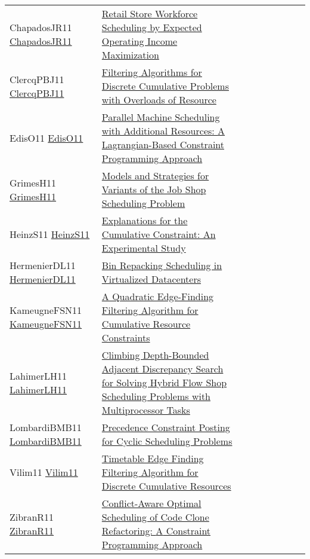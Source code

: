 {\begin{longtable}{p{3cm}p{7cm}lllllll}
ChapadosJR11 \href{https://doi.org/10.1007/978-3-642-21311-3\_7}{ChapadosJR11} &  \href{papers/ChapadosJR11.pdf}{Retail Store Workforce Scheduling by Expected Operating Income Maximization} &  &  &  &  &  &  & \\
ClercqPBJ11 \href{https://doi.org/10.1007/978-3-642-23786-7\_20}{ClercqPBJ11} &  \href{papers/ClercqPBJ11.pdf}{Filtering Algorithms for Discrete Cumulative Problems with Overloads of Resource} &  &  &  &  &  &  & \\
EdisO11 \href{https://doi.org/10.1007/978-3-642-21311-3\_10}{EdisO11} &  \href{papers/EdisO11.pdf}{Parallel Machine Scheduling with Additional Resources: {A} Lagrangian-Based Constraint Programming Approach} &  &  &  &  &  &  & \\
GrimesH11 \href{https://doi.org/10.1007/978-3-642-23786-7\_28}{GrimesH11} &  \href{papers/GrimesH11.pdf}{Models and Strategies for Variants of the Job Shop Scheduling Problem} &  &  &  &  &  &  & \\
HeinzS11 \href{https://doi.org/10.1007/978-3-642-20662-7\_34}{HeinzS11} &  \href{papers/HeinzS11.pdf}{Explanations for the Cumulative Constraint: An Experimental Study} &  &  &  &  &  &  & \\
HermenierDL11 \href{https://doi.org/10.1007/978-3-642-23786-7\_5}{HermenierDL11} &  \href{papers/HermenierDL11.pdf}{Bin Repacking Scheduling in Virtualized Datacenters} &  &  &  &  &  &  & \\
KameugneFSN11 \href{https://doi.org/10.1007/978-3-642-23786-7\_37}{KameugneFSN11} &  \href{papers/KameugneFSN11.pdf}{A Quadratic Edge-Finding Filtering Algorithm for Cumulative Resource Constraints} &  &  &  &  &  &  & \\
LahimerLH11 \href{https://doi.org/10.1007/978-3-642-21311-3\_12}{LahimerLH11} &  \href{papers/LahimerLH11.pdf}{Climbing Depth-Bounded Adjacent Discrepancy Search for Solving Hybrid Flow Shop Scheduling Problems with Multiprocessor Tasks} &  &  &  &  &  &  & \\
LombardiBMB11 \href{https://doi.org/10.1007/978-3-642-21311-3\_14}{LombardiBMB11} &  \href{papers/LombardiBMB11.pdf}{Precedence Constraint Posting for Cyclic Scheduling Problems} &  &  &  &  &  &  & \\
Vilim11 \href{https://doi.org/10.1007/978-3-642-21311-3\_22}{Vilim11} &  \href{papers/Vilim11.pdf}{Timetable Edge Finding Filtering Algorithm for Discrete Cumulative Resources} &  &  &  &  &  &  & \\
ZibranR11 \href{https://doi.org/10.1109/ICPC.2011.45}{ZibranR11} &  \href{papers/ZibranR11.pdf}{Conflict-Aware Optimal Scheduling of Code Clone Refactoring: {A} Constraint Programming Approach} &  &  &  &  &  &  & \\

\end{longtable}}
